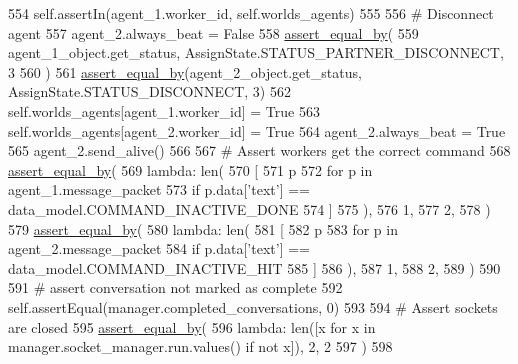 \begin{DoxyCode}
554         self.assertIn(agent\_1.worker\_id, self.worlds\_agents)
555 
556         \textcolor{comment}{# Disconnect agent}
557         agent\_2.always\_beat = \textcolor{keyword}{False}
558         \hyperlink{namespaceparlai_1_1mturk_1_1core_1_1test_1_1test__full__system_a0b463246d35658a2e422010f13dcf819}{assert\_equal\_by}(
559             agent\_1\_object.get\_status, AssignState.STATUS\_PARTNER\_DISCONNECT, 3
560         )
561         \hyperlink{namespaceparlai_1_1mturk_1_1core_1_1test_1_1test__full__system_a0b463246d35658a2e422010f13dcf819}{assert\_equal\_by}(agent\_2\_object.get\_status, AssignState.STATUS\_DISCONNECT, 3)
562         self.worlds\_agents[agent\_1.worker\_id] = \textcolor{keyword}{True}
563         self.worlds\_agents[agent\_2.worker\_id] = \textcolor{keyword}{True}
564         agent\_2.always\_beat = \textcolor{keyword}{True}
565         agent\_2.send\_alive()
566 
567         \textcolor{comment}{# Assert workers get the correct command}
568         \hyperlink{namespaceparlai_1_1mturk_1_1core_1_1test_1_1test__full__system_a0b463246d35658a2e422010f13dcf819}{assert\_equal\_by}(
569             \textcolor{keyword}{lambda}: len(
570                 [
571                     p
572                     \textcolor{keywordflow}{for} p \textcolor{keywordflow}{in} agent\_1.message\_packet
573                     \textcolor{keywordflow}{if} p.data[\textcolor{stringliteral}{'text'}] == data\_model.COMMAND\_INACTIVE\_DONE
574                 ]
575             ),
576             1,
577             2,
578         )
579         \hyperlink{namespaceparlai_1_1mturk_1_1core_1_1test_1_1test__full__system_a0b463246d35658a2e422010f13dcf819}{assert\_equal\_by}(
580             \textcolor{keyword}{lambda}: len(
581                 [
582                     p
583                     \textcolor{keywordflow}{for} p \textcolor{keywordflow}{in} agent\_2.message\_packet
584                     \textcolor{keywordflow}{if} p.data[\textcolor{stringliteral}{'text'}] == data\_model.COMMAND\_INACTIVE\_HIT
585                 ]
586             ),
587             1,
588             2,
589         )
590 
591         \textcolor{comment}{# assert conversation not marked as complete}
592         self.assertEqual(manager.completed\_conversations, 0)
593 
594         \textcolor{comment}{# Assert sockets are closed}
595         \hyperlink{namespaceparlai_1_1mturk_1_1core_1_1test_1_1test__full__system_a0b463246d35658a2e422010f13dcf819}{assert\_equal\_by}(
596             \textcolor{keyword}{lambda}: len([x \textcolor{keywordflow}{for} x \textcolor{keywordflow}{in} manager.socket\_manager.run.values() \textcolor{keywordflow}{if} \textcolor{keywordflow}{not} x]), 2, 2
597         )
598 
\end{DoxyCode}
